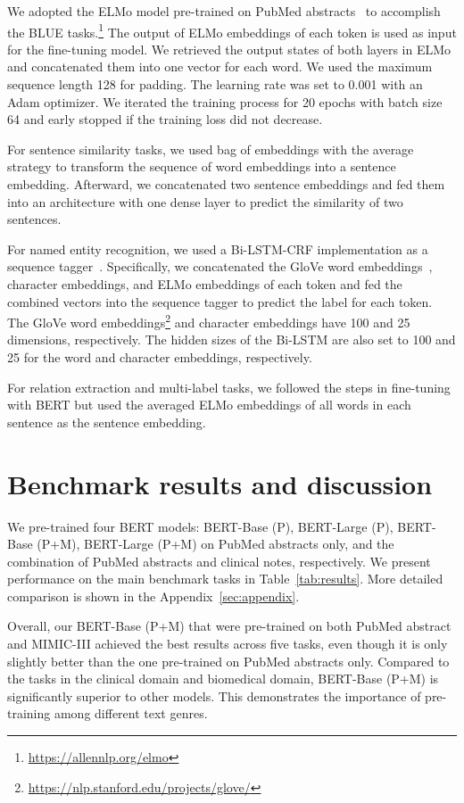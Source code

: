 \documentclass[11pt,a4paper]{article}
\begin{document}
We adopted the ELMo model pre-trained on PubMed abstracts~\cite{peters2017semi} to accomplish the BLUE tasks.\footnote{\url{https://allennlp.org/elmo}} The output of ELMo embeddings of each token is used as input for the fine-tuning model. We retrieved the output states of both layers in ELMo and concatenated them into one vector for each word. We used the maximum sequence length 128 for padding. The learning rate was set to 0.001 with an Adam optimizer. We iterated the training process for 20 epochs with batch size 64 and early stopped if the training loss did not decrease.

For sentence similarity tasks, we used bag of embeddings with the average strategy to transform the sequence of word embeddings into a sentence embedding. Afterward, we concatenated two sentence embeddings and fed them into an architecture with one dense layer to predict the similarity of two sentences.

For named entity recognition, we used a Bi-LSTM-CRF implementation as a sequence tagger~\cite{huang2015bidirectional,si2019enhancing,lample2016neural}. Specifically, we concatenated the GloVe word embeddings~\cite{pennington2014glove}, character embeddings, and ELMo embeddings of each token and fed the combined vectors into the sequence tagger to predict the label for each token. The GloVe word embeddings\footnote{\url{https://nlp.stanford.edu/projects/glove/}} and character embeddings have 100 and 25 dimensions, respectively. The hidden sizes of the Bi-LSTM are also set to 100 and 25 for the word and character embeddings, respectively.

For relation extraction and multi-label tasks, we followed the steps in fine-tuning with BERT but used the averaged ELMo embeddings of all words in each sentence as the sentence embedding.

\section{Benchmark results and discussion}

We pre-trained four BERT models: BERT-Base (P), BERT-Large (P), BERT-Base (P+M), BERT-Large (P+M) on PubMed abstracts only, and the combination of PubMed abstracts and clinical notes, respectively. We present performance on the main benchmark tasks in Table~\ref{tab:results}. More detailed comparison is shown in the Appendix~\ref{sec:appendix}.

Overall, our BERT-Base (P+M) that were pre-trained on both PubMed abstract and MIMIC-III achieved the best results across five tasks, even though it is only slightly better than the one pre-trained on PubMed abstracts only. Compared to the tasks in the clinical domain and biomedical domain, BERT-Base (P+M) is significantly superior to other models. This demonstrates the importance of pre-training among different text genres. 
\end{document}
